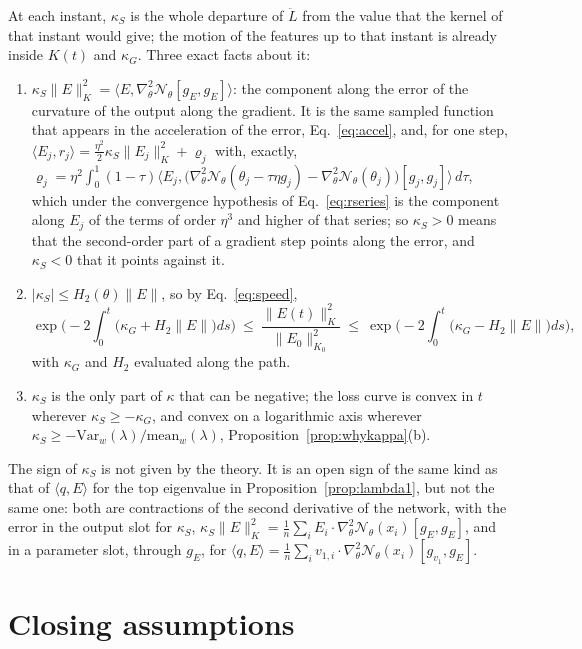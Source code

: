 \documentclass[11pt]{article}
\theoremstyle{definition}
\theoremstyle{remark}
\newcommand{\Net}{\mathcal{N}_\theta}    %
\newcommand{\ip}[2]{\langle #1,#2\rangle}
\begin{document}
At each instant, $\kappa_S$ is the whole departure of $\ddot L$ from the value that the kernel of that instant would give; the motion of the features up to that instant is already inside $K(t)$ and $\kappa_G$.
Three exact facts about it:
\begin{enumerate}[label=(\roman*)]
\item $\kappa_S\|E\|_K^2 = \ip{E}{\nabla^2_\theta\Net[g_E,g_E]}$: the component along the error of the curvature of the output along the gradient.
It is the same sampled function that appears in the acceleration of the error, Eq.~\eqref{eq:accel}, and, for one step, $\ip{E_j}{r_j} = \frac{\eta^2}{2}\kappa_S\|E_j\|_K^2 + \varrho_j$ with, exactly, $\varrho_j = \eta^2\int_0^1(1 - \tau)\ip{E_j}{\big(\nabla^2_\theta\Net(\theta_j - \tau\eta g_j) - \nabla^2_\theta\Net(\theta_j)\big)[g_j,g_j]}\,d\tau$, which under the convergence hypothesis of Eq.~\eqref{eq:rseries} is the component along $E_j$ of the terms of order $\eta^3$ and higher of that series; so $\kappa_S > 0$ means that the second-order part of a gradient step points along the error, and $\kappa_S < 0$ that it points against it.
\item $|\kappa_S|\le H_2(\theta)\|E\|$, so by Eq.~\eqref{eq:speed},
\begin{equation}\label{eq:sandwich}
\exp\Big(-2\int_0^t\big(\kappa_G + H_2\|E\|\big)ds\Big)\ \le\ \frac{\|E(t)\|_K^2}{\|E_0\|_{K_0}^2}\ \le\ \exp\Big(-2\int_0^t\big(\kappa_G - H_2\|E\|\big)ds\Big),
\end{equation}
with $\kappa_G$ and $H_2$ evaluated along the path.
\item $\kappa_S$ is the only part of $\kappa$ that can be negative; the loss curve is convex in $t$ wherever $\kappa_S\ge-\kappa_G$, and convex on a logarithmic axis wherever $\kappa_S\ge-\mathrm{Var}_w(\lambda)/\mathrm{mean}_w(\lambda)$, Proposition~\ref{prop:whykappa}(b).
\end{enumerate}
The sign of $\kappa_S$ is not given by the theory.
It is an open sign of the same kind as that of $\ip{q}{E}$ for the top eigenvalue in Proposition~\ref{prop:lambda1}, but not the same one: both are contractions of the second derivative of the network, with the error in the output slot for $\kappa_S$, $\kappa_S\|E\|_K^2 = \frac1n\sum_iE_i\cdot\nabla^2_\theta\Net(x_i)[g_E,g_E]$, and in a parameter slot, through $g_E$, for $\ip{q}{E} = \frac1n\sum_iv_{1,i}\cdot\nabla^2_\theta\Net(x_i)[g_{v_1},g_E]$.

\section{Closing assumptions}\label{sec:closing}
\end{document}
